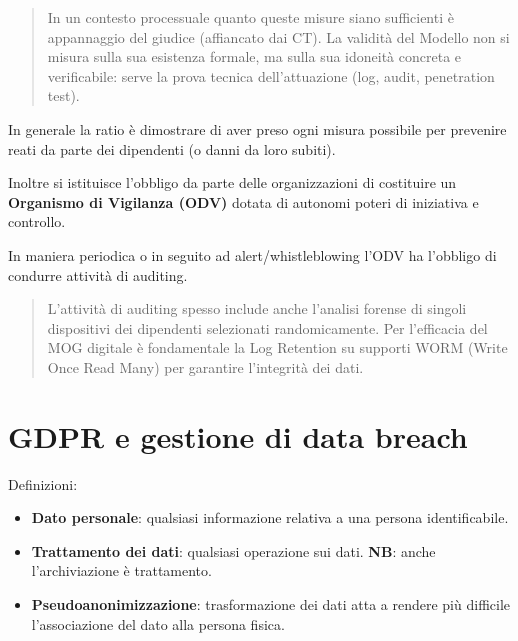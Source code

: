 \documentclass[11pt,a4paper]{article}
\begin{document}
\begin{quote}
In un contesto processuale quanto queste misure siano sufficienti è appannaggio del giudice (affiancato dai CT). La validità del Modello non si misura sulla sua esistenza formale, ma sulla sua idoneità concreta e verificabile: serve la prova tecnica dell'attuazione (log, audit, penetration test).
\end{quote}

In generale la ratio è dimostrare di aver preso ogni misura possibile per prevenire reati da parte dei dipendenti (o danni da loro subiti).

Inoltre si istituisce l'obbligo da parte delle organizzazioni di costituire un \textbf{Organismo di Vigilanza (ODV)} dotata di autonomi poteri di iniziativa e controllo.

In maniera periodica o in seguito ad alert/whistleblowing l'ODV ha l'obbligo di condurre attività di auditing. 
\begin{quote}
L'attività di auditing spesso include anche l'analisi forense di singoli dispositivi dei dipendenti selezionati randomicamente. Per l'efficacia del MOG digitale è fondamentale la Log Retention su supporti WORM (Write Once Read Many) per garantire l'integrità dei dati.
\end{quote}

\section{GDPR e gestione di data breach}
Definizioni:
\begin{itemize}
    \item \textbf{Dato personale}: qualsiasi informazione relativa a una persona identificabile.
    \item \textbf{Trattamento dei dati}: qualsiasi operazione sui dati. \textbf{NB}: anche l'archiviazione è trattamento.
    \item \textbf{Pseudoanonimizzazione}: trasformazione dei dati atta a rendere più difficile l'associazione del dato alla persona fisica.
\end{itemize}
\end{document}
